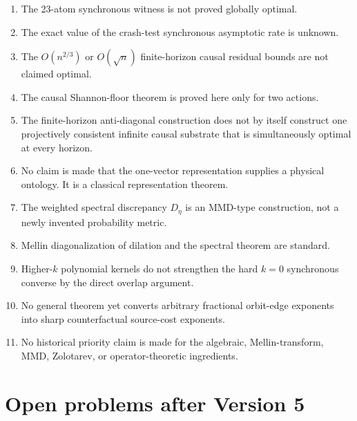 \documentclass[11pt,a4paper]{article}
\newcommand{\1}{\mathbf 1}
\begin{document}
\begin{enumerate}[leftmargin=8mm]

\item The 23-atom synchronous witness is not proved globally optimal.

\item The exact value of the crash-test synchronous asymptotic rate is
unknown.

\item The \(O(n^{2/3})\) or \(O(\sqrt n)\) finite-horizon causal residual
bounds are not claimed optimal.

\item The causal Shannon-floor theorem is proved here only for two
actions.

\item The finite-horizon anti-diagonal construction does not by itself
construct one projectively consistent infinite causal substrate that is
simultaneously optimal at every horizon.

\item No claim is made that the one-vector representation supplies a
physical ontology.
It is a classical representation theorem.

\item The weighted spectral discrepancy \(D_\eta\) is an MMD-type
construction, not a newly invented probability metric.

\item Mellin diagonalization of dilation and the spectral theorem are
standard.

\item Higher-\(k\) polynomial kernels do not strengthen the hard
\(k=0\) synchronous converse by the direct overlap argument.

\item No general theorem yet converts arbitrary fractional orbit-edge
exponents into sharp counterfactual source-cost exponents.

\item No historical priority claim is made for the algebraic,
Mellin-transform, MMD, Zolotarev, or operator-theoretic ingredients.

\end{enumerate}


\section{Open problems after Version 5}
\end{document}
